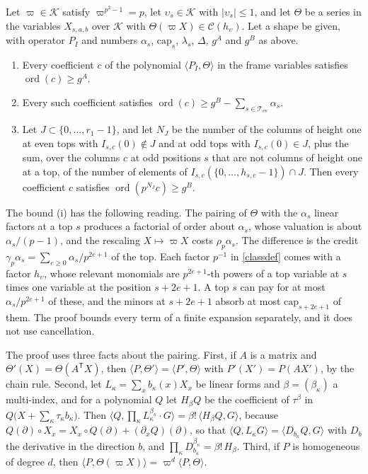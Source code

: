 \begin{theorem}\label{thm:valuation}
Let $\varpi\in\mathcal K$ satisfy $\varpi^{p^2-1}=p$, let $\upsilon_s\in\mathcal K$ with $\lvert\upsilon_s\rvert\le1$, and let $\Theta$ be a series in the variables $X_{s,a,b}$ over $\mathcal K$ with $\Theta(\varpi X)\in\mathcal C(h_\upsilon)$. Let a shape be given, with operator $P_I$ and numbers $\alpha_s$, $\mathrm{cap}_s$, $\lambda_s$, $\Delta$, $g^A$ and $g^B$ as above.
\begin{enumerate}
\item[(i)] Every coefficient $c$ of the polynomial $\langle P_I,\Theta\rangle$ in the frame variables satisfies $\operatorname{ord}(c)\ge g^A$.
\item[(ii)] Every such coefficient satisfies $\operatorname{ord}(c)\ge g^B-\sum_{s\in\mathcal T_{\mathrm{ev}}}\alpha_s$.
\item[(iii)] Let $J\subset\{0,\dots,r_1-1\}$, and let $N_J$ be the number of the columns of height one at even tops with $I_{s,c}(0)\notin J$ and at odd tops with $I_{s,c}(0)\in J$, plus the sum, over the columns $c$ at odd positions $s$ that are not columns of height one at a top, of the number of elements of $I_{s,c}(\{0,\dots,h_{s,c}-1\})\cap J$. Then every coefficient $c$ satisfies $\operatorname{ord}(p^{N_J}c)\ge g^B$.
\end{enumerate}
\end{theorem}

The bound (i) has the following reading. The pairing of $\Theta$ with the $\alpha_s$ linear factors at a top $s$ produces a factorial of order about $\alpha_s$, whose valuation is about $\alpha_s/(p-1)$, and the rescaling $X\mapsto\varpi X$ costs $\rho_p\alpha_s$. The difference is the credit $\gamma_p\alpha_s=\sum_{e\ge0}\alpha_s/p^{2e+1}$ of the top. Each factor $p^{-1}$ in \eqref{classdef} comes with a factor $h_\upsilon$, whose relevant monomials are $p^{2e+1}$-th powers of a top variable at $s$ times one variable at the position $s+2e+1$. A top $s$ can pay for at most $\alpha_s/p^{2e+1}$ of these, and the minors at $s+2e+1$ absorb at most $\mathrm{cap}_{s+2e+1}$ of them. The proof bounds every term of a finite expansion separately, and it does not use cancellation.

The proof uses three facts about the pairing. First, if $A$ is a matrix and $\Theta'(X)=\Theta(A^{\mathsf T}X)$, then $\langle P,\Theta'\rangle=\langle P',\Theta\rangle$ with $P'(X')=P(AX')$, by the chain rule. Second, let $L_\kappa=\sum_xb_\kappa(x)X_x$ be linear forms and $\beta=(\beta_\kappa)$ a multi-index, and for a polynomial $Q$ let $H_\beta Q$ be the coefficient of $\tau^\beta$ in $Q\big(X+\sum_\kappa\tau_\kappa b_\kappa\big)$. Then $\langle Q,\prod_\kappa L_\kappa^{\beta_\kappa}\cdot G\rangle=\beta!\,\langle H_\beta Q,G\rangle$, because $Q(\partial)\circ X_x=X_x\circ Q(\partial)+(\partial_xQ)(\partial)$, so that $\langle Q,L_\kappa G\rangle=\langle D_{b_\kappa}Q,G\rangle$ with $D_b$ the derivative in the direction $b$, and $\prod_\kappa D_{b_\kappa}^{\beta_\kappa}=\beta!\,H_\beta$. Third, if $P$ is homogeneous of degree $d$, then $\langle P,\Theta(\varpi X)\rangle=\varpi^d\langle P,\Theta\rangle$.


